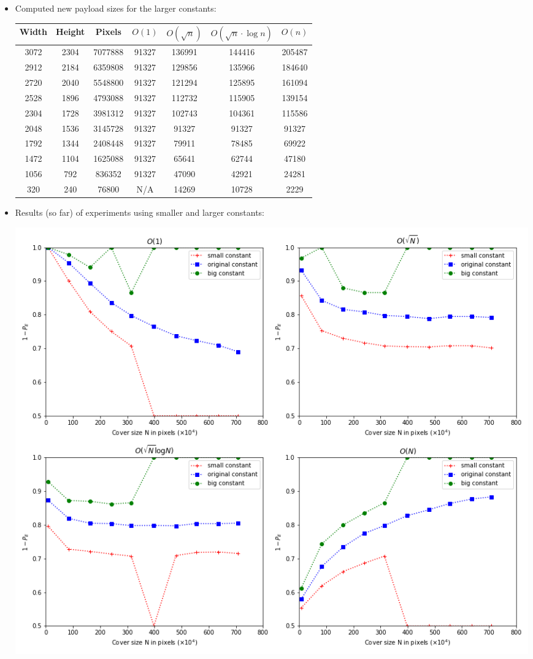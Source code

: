 \documentclass[11pt,a4paper]{report}
\begin{document}
\begin{itemize}
\begin{itemize}
      \item Computed new payload sizes for the larger constants:
      \begin{center}
        \begin{tabular}{ c c c | c c c c }
        Width & Height & Pixels & $O(1)$ & $O(\sqrt{n})$ & $O(\sqrt{n} \cdot \log n)$ & $O(n)$ \\ \hline
        3072 & 2304 & 7077888 & 91327 & 136991 & 144416 & 205487 \\
        2912 & 2184 & 6359808 & 91327 & 129856 & 135966 & 184640 \\
        2720 & 2040 & 5548800 & 91327 & 121294 & 125895 & 161094 \\
        2528 & 1896 & 4793088 & 91327 & 112732 & 115905 & 139154 \\
        2304 & 1728 & 3981312 & 91327 & 102743 & 104361 & 115586 \\
        2048 & 1536 & 3145728 & 91327 & 91327 & 91327 & 91327 \\
        1792 & 1344 & 2408448 & 91327 & 79911 & 78485 & 69922 \\
        1472 & 1104 & 1625088 & 91327 & 65641 & 62744 & 47180 \\
        1056 & 792 & 836352 & 91327 & 47090 & 42921 & 24281 \\
        320 & 240 & 76800 & N/A & 14269 & 10728 & 2229 \\
        \end{tabular}
      \end{center}

      \item Results (so far) of experiments using smaller and larger constants:
        \begin{center}
          \includegraphics[width=\linewidth]{graph_07_03_2019.png}
        \end{center}


\end{itemize}
\end{itemize}
\end{document}
